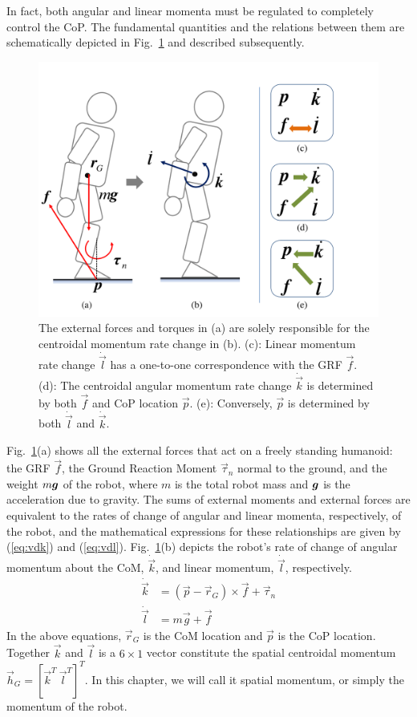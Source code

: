 \documentclass{llncs}
\newcommand{\bg}{\mbox{\boldmath $g$}}
\newcommand{\vg}{\vec{g}}
\newcommand{\vp}{\vec{p}}
\newcommand{\vk}{\vec{k}}
\newcommand{\vr}{\vec{r}}
\newcommand{\vtau}{\vec{\tau}}
\newcommand{\vf}{\vec{f}}
\newcommand{\vh}{\vec{h}}
\newcommand{\vdk} {\dot{\vec{k}}}
\newcommand{\vl}{\vec{l}}
\newcommand{\vdl} {\dot{\vec{l}}}
\begin{document}
In fact, both angular and linear momenta
must be regulated to completely control the CoP. The fundamental quantities and the
relations between them are schematically depicted in Fig.~\ref{fig:one2one} and described subsequently.
\begin{figure}[h]
\begin{center}
\includegraphics[width=0.6\columnwidth]{Figures/one2one_new_line.pdf}%
\caption{
The external forces and torques in (a) are solely responsible
for the centroidal momentum rate change in (b).
(c): Linear momentum rate change $\vdl$ has a one-to-one
correspondence with the GRF $\vf$.
(d): The centroidal angular momentum rate change $\vdk$
is determined by both $\vf$ and CoP location $\vp$.
(e): Conversely, $\vp$ is determined by both
$\vdl$ and $\vdk$. %
}
\label{fig:one2one}%
\end{center}
\end{figure}

Fig.~\ref{fig:one2one}(a) shows all the external forces that act on a freely
standing humanoid: the GRF $\vf$, the Ground Reaction Moment
$\vtau_n$ normal to the ground, and the weight $m\bg$ of the robot,
where $m$ is the total robot mass and $\bg$ is the acceleration due to gravity. The
sums of external moments and external forces are equivalent to the rates of change of angular and linear momenta, respectively, of the robot, and the mathematical expressions for these relationships are given by (\ref{eq:vdk}) and (\ref{eq:vdl}). Fig.~\ref{fig:one2one}(b) depicts the robot's
 rate of change of angular momentum about the CoM, $\vdk$, and linear momentum, $\vdl$, respectively.
\begin{align}
	\vdk &= (\vp - \vr_G)\times\vf + \vtau_n \label{eq:vdk}\\
	\vdl &= m\vg + \vf \label{eq:vdl}	
\end{align}
In the above equations, $\vr_G$ is the CoM location and $\vp$ is the CoP location.
Together $\vk$ and $\vl$ is a $6\times 1$ vector constitute the spatial centroidal momentum
$\vh_G=[\vk^T~\vl^T]^T$.
In this chapter, we will call it spatial momentum, or simply the momentum of the robot. 
\end{document}
